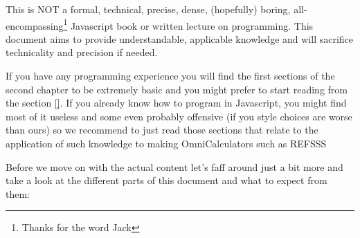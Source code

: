 \documentclass[11pt,a4paper,oldfontcommands]{memoir}
\begin{document}
This is NOT a formal, technical, precise, dense, (hopefully) boring, all-encompassing\footnote{Thanks for the word Jack} Javascript book or written lecture on programming. This document aims to provide understandable, applicable knowledge and will sacrifice technicality and precision if needed. 

If you have any programming experience you will find the first sections of the second chapter to be extremely basic and you might prefer to start reading from the section \ref{}{}. If you already know how to program in Javascript, you might find most of it useless and some even probably offensive (if you style choices are worse than ours) so we recommend to just read those sections that relate to the application of such knowledge to making OmniCalculators such as REFSSS

Before we move on with the actual content let's faff around just a bit more and take a look at the different parts of this document and what to expect from them:
\end{document}
